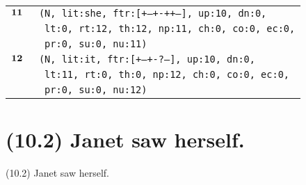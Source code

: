 \documentclass{article}
\begin{document}
\begin{minipage}{\textwidth}
{\begin{tabular}{|r|l|}
    ${\textbf{\textrm{11}}_{\phantom{z}}}$ & \texttt{\texttt{(N,~lit:she,~ftr:[+--+-++--],~up:10,~dn:0,}} \\
    & \texttt{\texttt{~lt:0,~rt:12,~th:12,~np:11,~ch:0,~co:0,~ec:0,}} \\
    & \texttt{\texttt{~pr:0,~su:0,~nu:11)}} \\
    ${\textbf{\textrm{12}}_{\phantom{z}}}$ & \texttt{\texttt{(N,~lit:it,~ftr:[+--+-?---],~up:10,~dn:0,}} \\
    & \texttt{\texttt{~lt:11,~rt:0,~th:0,~np:12,~ch:0,~co:0,~ec:0,}} \\
    & \texttt{\texttt{~pr:0,~su:0,~nu:12)}} \\
    \hline
  \end{tabular}
  }
\end{minipage}
\bigbreak

\clearpage

%
%

\section*{(10.2) Janet saw herself.}

\bigbreak
\begin{enumerate*}
\item[(10.2)] Janet saw herself.
\end{enumerate*}
\bigbreak

\bigbreak
\begin{minipage}{\textwidth}
\end{minipage}
\bigbreak
\end{document}
